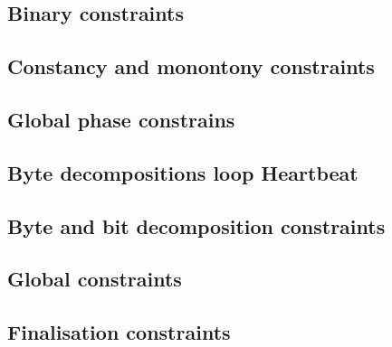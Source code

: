 \subsection{Binary constraints}                        \label{rlptxn: generalities: binary constraints}                   
\subsection{Constancy and monontony constraints}       \label{rlptxn: generalities: constancy and monotony constraints}   
\subsection{Global phase constrains}                   \label{rlptxn: generalities: phase constraints}                    
\subsection{Byte decompositions loop Heartbeat}        \label{rlptxn: generalities: loop constraints}                     
\subsection{Byte and bit decomposition constraints}    \label{rlptxn: generalities: byte and bit decompositions}          
\subsection{Global constraints}                        \label{rlptxn: generalities: global constraints}                   
\subsection{Finalisation constraints}                  \label{rlptxn: generalities: finalization}                         
